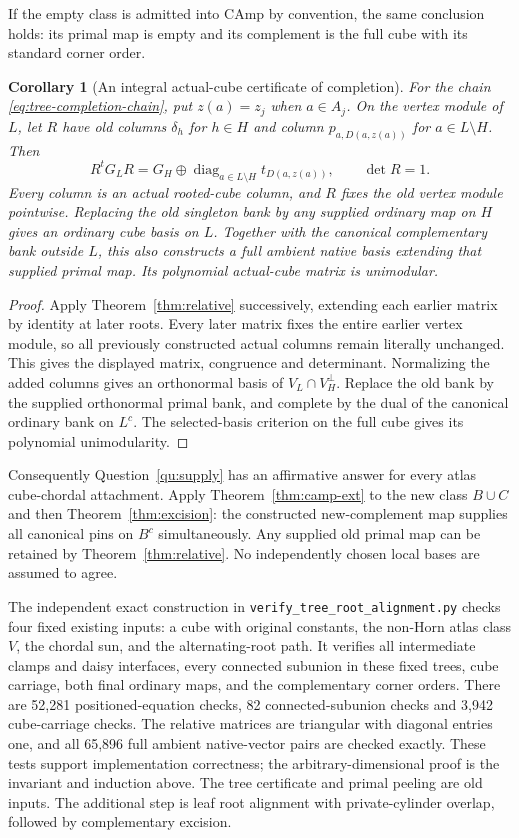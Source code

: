 \documentclass[11pt]{article}
\newtheorem{corollary}[theorem]{Corollary}
\theoremstyle{definition}
\begin{document}
If the empty class is admitted into $\mathrm{CAmp}$ by convention,
the same conclusion holds: its primal map is empty and its complement
is the full cube with its standard corner order.

\begin{corollary}[An integral actual-cube certificate of completion]
\label{cor:tree-integral-completion}
For the chain \eqref{eq:tree-completion-chain}, put $z(a)=z_j$
when $a\in A_j$. On the vertex module of $L$, let $R$ have old columns
$\delta_h$ for $h\in H$ and column $p_{a,D(a,z(a))}$ for
$a\in L\setminus H$. Then
\[
 R^tG_LR=G_H\oplus
       \operatorname{diag}_{a\in L\setminus H}t_{D(a,z(a))},
 \qquad\det R=1.
\]
Every column is an actual rooted-cube column, and $R$ fixes the old
vertex module pointwise. Replacing the old singleton bank by any
supplied ordinary map on $H$ gives an ordinary cube basis on $L$.
Together with the canonical complementary bank outside $L$, this also
constructs a full ambient native basis extending that supplied primal
map. Its polynomial actual-cube matrix is unimodular.
\end{corollary}
\begin{proof}
Apply Theorem~\ref{thm:relative} successively, extending each earlier
matrix by identity at later roots. Every later matrix fixes the entire
earlier vertex module, so all previously constructed actual columns
remain literally unchanged. This gives the displayed matrix, congruence
and determinant. Normalizing the added columns gives an orthonormal
basis of $V_L\cap V_H^\perp$. Replace the old bank by the supplied
orthonormal primal bank, and complete by the dual of the canonical
ordinary bank on $L^c$. The selected-basis criterion on the full cube
gives its polynomial unimodularity.
\end{proof}

Consequently Question~\ref{qu:supply} has an affirmative answer for
every atlas cube-chordal attachment. Apply Theorem~\ref{thm:camp-ext}
to the new class $B\cup C$ and then Theorem~\ref{thm:excision}:
the constructed new-complement map supplies all canonical pins on $B^c$
simultaneously. Any supplied old primal map can be retained by
Theorem~\ref{thm:relative}. No independently chosen local bases are
assumed to agree.

The independent exact construction in \texttt{verify\_tree\_root\_alignment.py}
checks four fixed existing inputs: a cube with original constants, the
non-Horn atlas class $V$, the chordal sun, and the alternating-root path.
It verifies all intermediate clamps and daisy interfaces, every connected
subunion in these fixed trees, cube carriage, both final ordinary maps,
and the complementary corner orders. There are 52,281 positioned-equation
checks, 82 connected-subunion checks and 3,942 cube-carriage checks.
The relative matrices are triangular with diagonal entries one, and all 65,896
full ambient native-vector pairs are checked exactly.
These tests support implementation correctness; the arbitrary-dimensional
proof is the invariant and induction above. The tree certificate and
primal peeling are old inputs. The additional step is leaf root alignment
with private-cylinder overlap, followed by complementary excision.
\end{document}
